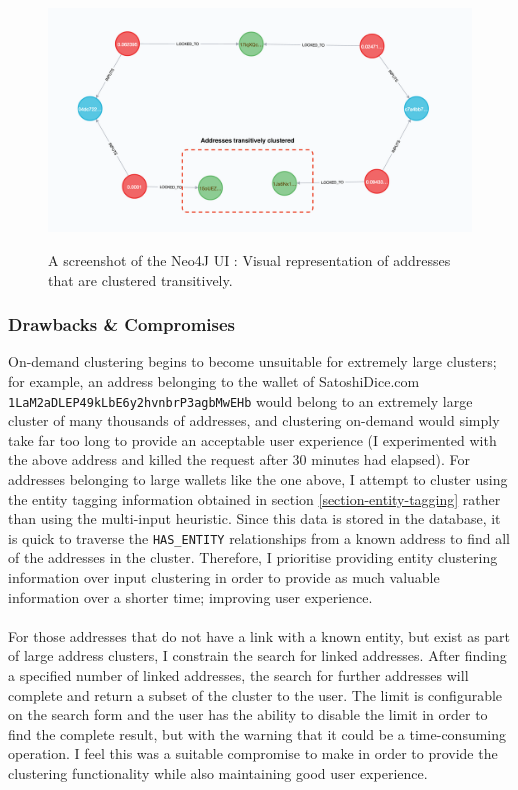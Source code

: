 \begin{figure}[h!]
  \centering
  \includegraphics[width = 15cm]{./figures/neo4j-screenshots/addresses-transitively-clustered}\\[0.5cm] 
  \caption{A screenshot of the Neo4J UI : Visual representation of addresses that are clustered transitively.}
  \label{fig:neo4j-transitive-clustering-screenshot}
\end{figure}

\subsubsection{Drawbacks \& Compromises}
On-demand clustering begins to become unsuitable for extremely large clusters; for example, an address belonging to the wallet of SatoshiDice.com \\\texttt{1LaM2aDLEP49kLbE6y2hvnbrP3agbMwEHb} would belong to an extremely large cluster of many thousands of addresses, and clustering on-demand would simply take far too long to provide an acceptable user experience (I experimented with the above address and killed the request after 30 minutes had elapsed). For addresses belonging to large wallets like the one above, I attempt to cluster using the entity tagging information obtained in section \ref{section-entity-tagging} rather than using the multi-input heuristic.
Since this data is stored in the database, it is quick to traverse the \texttt{HAS\_ENTITY} relationships from a known address to find all of the addresses in the cluster. Therefore, I prioritise providing entity clustering information over input clustering in order to provide as much valuable information over a shorter time; improving user experience. \\\\
For those addresses that do not have a link with a known entity, but exist as part of large address clusters, I constrain the search for linked addresses. After finding a specified number of linked addresses, the search for further addresses will complete and return a subset of the cluster to the user. The limit is configurable on the search form and the user has the ability to disable the limit in order to find the complete result, but with the warning that it could be a time-consuming operation. I feel this was a suitable compromise to make in order to provide the clustering functionality while also maintaining good user experience. 
